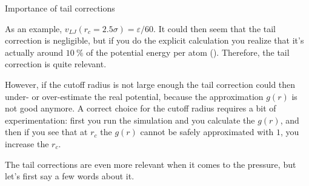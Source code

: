 \documentclass[10pt, compress, protectframetitle, handout]{beamer}
\begin{document}
\begin{frame}{Importance of tail corrections}

	As an example, $v_{LJ}(r_c=2.5\sigma) = \varepsilon/60$. It could then seem that the tail correction is negligible, but if you do the explicit calculation you realize that it's actually around $\SI{10}{\percent}$ of the potential energy per atom (\cite{Frenkel2002}). Therefore, the tail correction is quite relevant.
	
	However, if the cutoff radius is not large enough the tail correction could then under- or over-estimate the real potential, because the approximation $g(r)$ is not good anymore. A correct choice for the cutoff radius requires a bit of experimentation: first you run the simulation and you calculate the $g(r)$, and then if you see that at $r_c$ the $g(r)$ cannot be safely approximated with $1$, you increase the $r_c$.
	
	The tail corrections are even more relevant when it comes to the pressure, but let's first say a few words about it.

\end{frame}
\end{document}
